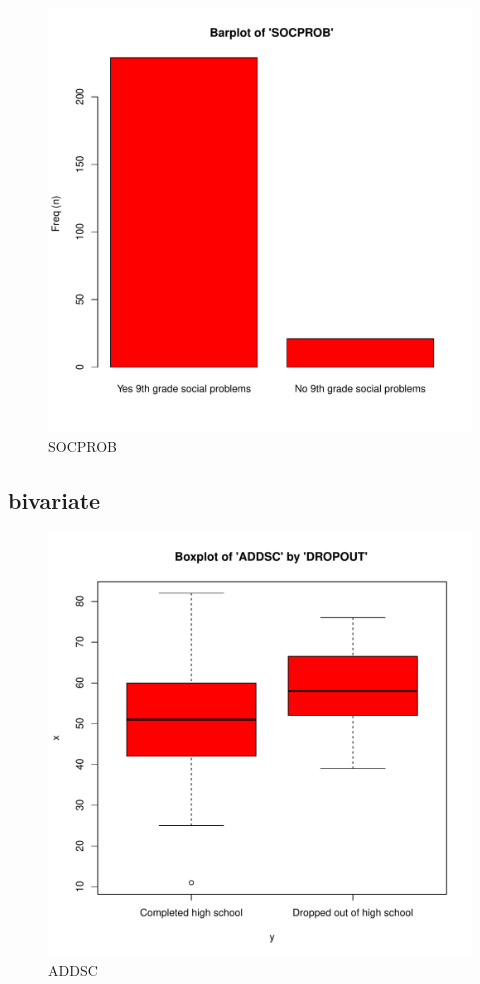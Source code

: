 \documentclass[a4paper,titlepage,12pt]{article}
\begin{document}
  \begin{figure}[H]
  \begin{center}
  \caption{SOCPROB}
  \includegraphics[width=17cm]{./allgroups_report_figures/uni_SOCPROB.pdf}
  \end{center}
  \end{figure}
  \subsection{bivariate}
    \begin{figure}[H]
    \begin{center}
    \caption{ADDSC}
    \includegraphics[width=17cm]{./allgroups_report_figures/bivar_ADDSC.pdf}
    \end{center}
    \end{figure}
    
\end{document}
